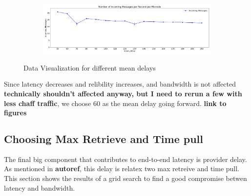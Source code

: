 \documentclass[a4paper,11pt,oneside]{report}
\begin{document}
\begin{figure}[htbp]
\begin{subfigure}{\textwidth}
        \caption{}
        \label{fig:lambdas_bandwidth}
    \end{subfigure}
    \hfill
    \begin{subfigure}{\textwidth}
        \centering
        \includegraphics[width=\textwidth]{plots/delays_incoming_messages.png}
        \caption{}
        \label{fig:lambdas_messages}
    \end{subfigure}
    \caption{Data Visualization for different mean delays}
\end{figure}

Since latency decreases and relibility increases, and bandwidth is not affected \textbf{technically shouldn't affected anyway, but I need to rerun a few with less chaff traffic}, we choose 60 as the mean delay going forward. \textbf{link to figures}

\subsection{Choosing Max Retrieve and Time pull}

The final big component that contributes to end-to-end latency is provider delay. As mentioned in \textbf{autoref}, this delay is relatex two max retreive and time pull. This section shows the results of a grid search to find a good compromise betwen latency and bandwidth.
\end{document}

